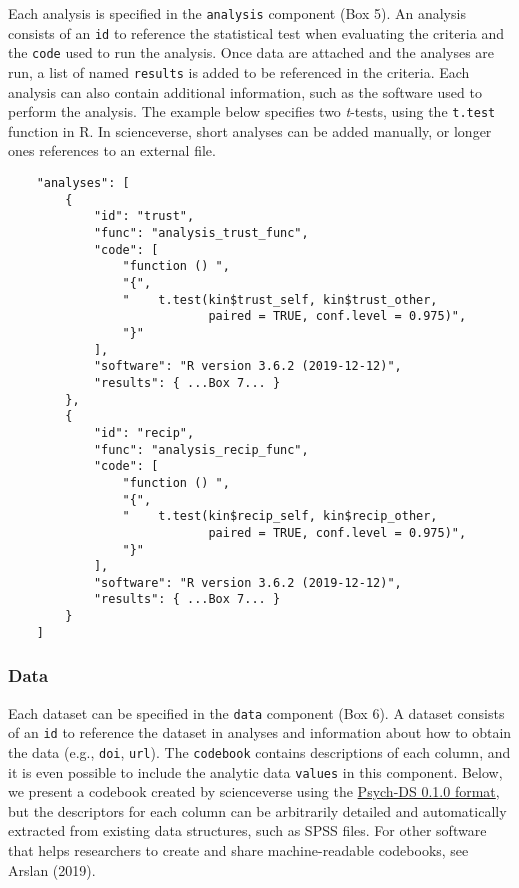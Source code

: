 \documentclass[english,doc,floatsintext]{apa6}
\begin{document}
Each analysis is specified in the \texttt{analysis} component (Box 5). An analysis consists of an \texttt{id} to reference the statistical test when evaluating the criteria and the \texttt{code} used to run the analysis. Once data are attached and the analyses are run, a list of named \texttt{results} is added to be referenced in the criteria. Each analysis can also contain additional information, such as the software used to perform the analysis. The example below specifies two \emph{t}-tests, using the \texttt{t.test} function in R. In scienceverse, short analyses can be added manually, or longer ones references to an external file.

\begin{tcolorbox}[colback=black!5!white,colframe=white!5!black,title=Box 5. The analysis component.]
\begin{verbatim}
    "analyses": [
        {
            "id": "trust",
            "func": "analysis_trust_func",
            "code": [
                "function () ",
                "{",
                "    t.test(kin$trust_self, kin$trust_other, 
                            paired = TRUE, conf.level = 0.975)",
                "}"
            ],
            "software": "R version 3.6.2 (2019-12-12)",
            "results": { ...Box 7... }
        },
        {
            "id": "recip",
            "func": "analysis_recip_func",
            "code": [
                "function () ",
                "{",
                "    t.test(kin$recip_self, kin$recip_other, 
                            paired = TRUE, conf.level = 0.975)",
                "}"
            ],
            "software": "R version 3.6.2 (2019-12-12)",
            "results": { ...Box 7... }
        }
    ]
\end{verbatim}
\end{tcolorbox}

\hypertarget{data}{%
\subsubsection{Data}\label{data}}

Each dataset can be specified in the \texttt{data} component (Box 6). A dataset consists of an \texttt{id} to reference the dataset in analyses and information about how to obtain the data (e.g., \texttt{doi}, \texttt{url}). The \texttt{codebook} contains descriptions of each column, and it is even possible to include the analytic data \texttt{values} in this component. Below, we present a codebook created by scienceverse using the \href{https://docs.google.com/document/d/1u8o5jnWk0Iqp_J06PTu5NjBfVsdoPbBhstht6W0fFp0/edit\#heading=h.caxnnxqaobj}{Psych-DS 0.1.0 format}, but the descriptors for each column can be arbitrarily detailed and automatically extracted from existing data structures, such as SPSS files. For other software that helps researchers to create and share machine-readable codebooks, see Arslan (2019).
\end{document}
